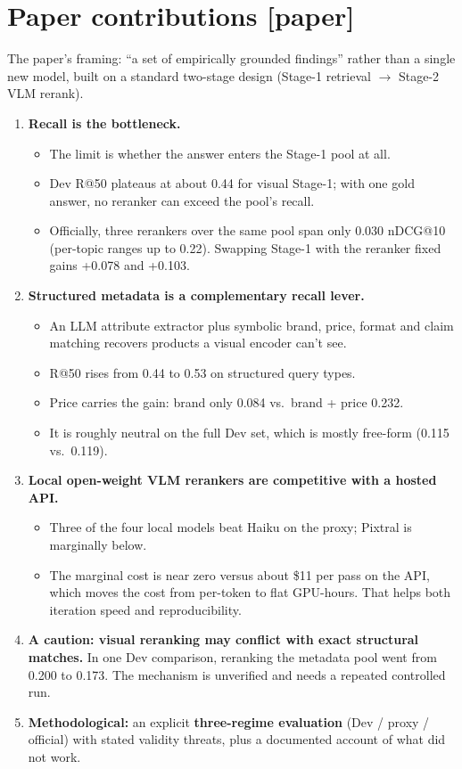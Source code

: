 \documentclass[11pt]{article}
\newcommand{\inpaper}{\textcolor{accent}{\small[paper]}}
\begin{document}
\section{Paper contributions \inpaper}
The paper's framing: ``a set of empirically grounded findings'' rather than a single new
model, built on a standard two-stage design (Stage-1 retrieval $\to$ Stage-2 VLM rerank).
\begin{enumerate}
  \item \textbf{Recall is the bottleneck.}
    \begin{itemize}
      \item The limit is whether the answer enters the Stage-1 pool at all.
      \item Dev R@50 plateaus at about 0.44 for visual Stage-1; with one gold answer, no
            reranker can exceed the pool's recall.
      \item Officially, three rerankers over the same pool span only 0.030 nDCG@10
            (per-topic ranges up to 0.22). Swapping Stage-1 with the reranker fixed gains
            +0.078 and +0.103.
    \end{itemize}
  \item \textbf{Structured metadata is a complementary recall lever.}
    \begin{itemize}
      \item An LLM attribute extractor plus symbolic brand, price, format and claim matching
            recovers products a visual encoder can't see.
      \item R@50 rises from 0.44 to 0.53 on structured query types.
      \item Price carries the gain: brand only 0.084 vs.\ brand + price 0.232.
      \item It is roughly neutral on the full Dev set, which is mostly free-form (0.115 vs.\
            0.119).
    \end{itemize}
  \item \textbf{Local open-weight VLM rerankers are competitive with a hosted API.}
    \begin{itemize}
      \item Three of the four local models beat Haiku on the proxy; Pixtral is marginally
            below.
      \item The marginal cost is near zero versus about \$11 per pass on the API, which moves
            the cost from per-token to flat GPU-hours. That helps both iteration speed and
            reproducibility.
    \end{itemize}
  \item \textbf{A caution: visual reranking may conflict with exact structural matches.} In
        one Dev comparison, reranking the metadata pool went from 0.200 to 0.173. The mechanism
        is unverified and needs a repeated controlled run.
  \item \textbf{Methodological:} an explicit \textbf{three-regime evaluation} (Dev / proxy /
        official) with stated validity threats, plus a documented account of what did not
        work.
\end{enumerate}
\end{document}
